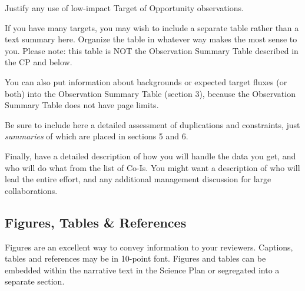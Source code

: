 \documentclass[letterpaper,12pt]{article}
\begin{document}
Justify any use of low-impact Target of Opportunity observations. \newline

If you have many targets, you may wish to include a separate 
table rather than a text summary here. Organize the
table in whatever way makes the most sense to you.   
Please note: this table is NOT the Observation
Summary Table described in the CP and below.  \newline

You can also put information about backgrounds or expected target 
fluxes (or both) into the Observation Summary Table (section
3), because the Observation Summary Table does not have page
limits.  \newline

Be sure to include here a detailed assessment of duplications and 
constraints, just {\em summaries} of which are placed in
sections 5 and 6.\newline

Finally, have a detailed description of how you will handle the
data you get, and who will do what from the list of Co-Is.  You
might want a description of who will lead the entire effort, and
any additional management discussion for large collaborations. 

\subsection{Figures, Tables \& References}

Figures are an excellent way to convey information to your reviewers.
Captions, tables and references may be in 10-point font.  Figures and tables 
can be embedded within the narrative text in the Science Plan or 
segregated into a separate section. \newline


\end{document}
